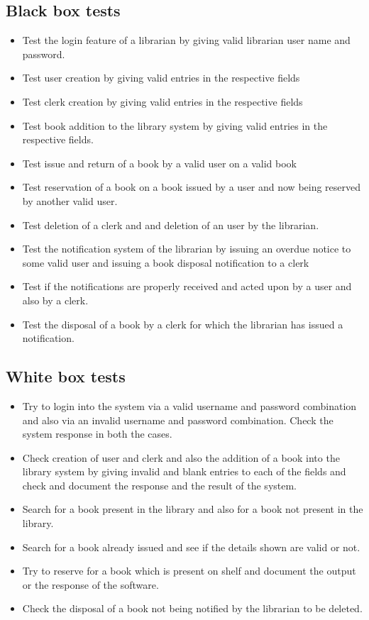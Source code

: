 \documentclass{article}
\begin{document}
\subsection{Black box tests}
\begin{itemize}
	\item Test the login feature of a librarian by giving valid librarian user name and password.
	
	\item Test user creation by giving valid entries in the respective fields
	\item Test clerk creation by giving valid entries in the respective fields
	\item Test book addition to the library system by giving valid entries in the respective fields.
	\item Test issue and return of a book by a valid user on a valid book
	\item Test reservation of a book on a book issued by a user and now being reserved by another valid user.
	\item Test deletion of a clerk and and deletion of an user by the librarian.
	\item Test the notification system of the librarian by issuing an overdue notice to some valid user and issuing a book disposal notification to a clerk
	\item Test if the notifications are properly received and acted upon by a user and also by a clerk.
	\item Test the disposal of a book by a clerk for which the librarian has issued a notification.
\end{itemize}


\subsection{White box tests}
\begin{itemize}
	\item Try to login into the system via a valid username and password combination and also via an invalid username and password combination. Check the system response in both the cases.
	\item Check creation of user and clerk and also the addition of a book into the library system by giving invalid and blank entries to each of the fields and check and document the response and the result of the system.
	\item Search for a book present in the library and also for a book not present in the library.
	\item Search for a book already issued and see if the details shown are valid or not.
	\item Try to reserve for a book which is present on shelf and document the output or the response of the software.
	\item Check the disposal of a book not being notified by the librarian to be deleted.

\end{itemize}
\end{document}
